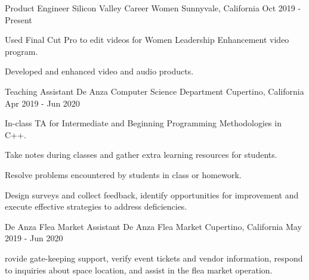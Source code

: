 

\begin{cventries}

  \cventry
    {Product Engineer} %
    {Silicon Valley Career Women} %
    {Sunnyvale, California} %
    {Oct 2019 - Present} %
    {
	\begin{cvitems} %
      	\item Used Final Cut Pro to edit videos for Women Leadership Enhancement video program.
      	\item Developed and enhanced video and audio products.
	\end{cvitems}
    }
    
  \cventry
    {Teaching Assistant} %
    {De Anza Computer Science Department} %
    {Cupertino, California} %
    {Apr 2019 - Jun 2020} %
    {
	\begin{cvitems} %
      	\item In-class TA for Intermediate and Beginning Programming Methodologies in C++.
		\item Take notes during classes and gather extra learning resources for students.       
      	\item Resolve problems encountered by students in class or homework.
      	\item Design surveys and collect feedback, identify opportunities for improvement and execute effective strategies to address deficiencies.
	\end{cvitems}
    }
    
  \cventry
    {De Anza Flea Market Assistant} %
    {De Anza Flea Market} %
    {Cupertino, California} %
    {May 2019 - Jun 2020} %
    {
	\begin{cvitems} %
      	\item rovide gate-keeping support, verify event tickets and vendor information, respond to inquiries about space location, and assist in the flea market operation.
	\end{cvitems}
    }
	  

\end{cventries}
